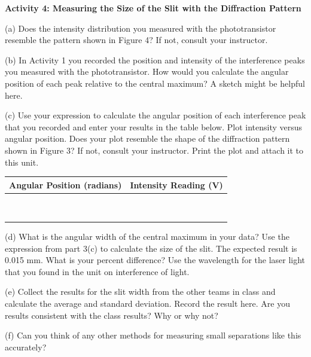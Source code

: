 \textbf{Activity 4: Measuring the Size of the Slit with the Diffraction
Pattern }

(a) Does the intensity distribution you measured with the phototransistor
resemble the pattern shown in Figure 4? If not, consult your instructor.
\vspace{10mm}

(b) In Activity 1 you recorded the position and intensity of the interference
peaks you measured with the phototransistor. How would you calculate
the angular position of each peak relative to the central maximum?
A sketch might be helpful here.
\vspace{30mm}

(c) Use your expression to calculate the angular position of each
interference peak that you recorded and enter your results in the
table below. Plot intensity versus angular position.
Does your plot resemble the shape of the diffraction pattern shown
in Figure 3? If not, consult your instructor. Print the plot and attach
it to this unit.

\vspace{0.3cm}
{\centering \begin{tabular}{|c|c|}
\hline 
Angular Position (radians)&
Intensity Reading (V)\\
\hline
\hline 
&
\\
\hline 
&
\\
\hline 
&
\\
\hline 
&
\\
\hline 
&
\\
\hline 
&
\\
\hline 
&
\\
\hline 
&
\\
\hline 
&
\\
\hline
\end{tabular}\par}
\vspace{0.3cm}

(d) What is the angular width of the central maximum in your data?
Use the expression from part 3(c) to calculate the size of the slit.
The expected result is 0.015 mm. What is your percent difference?
Use the wavelength for the laser light that you found in the unit
on interference of light.
\vspace{30mm}

(e) Collect the results for the slit width from the other teams in class
and calculate the average and standard deviation. Record the result here.
Are you results consistent with the class results? Why or why not?
\vspace{30mm}

(f) Can you think of any other methods for measuring small separations
like this accurately?
